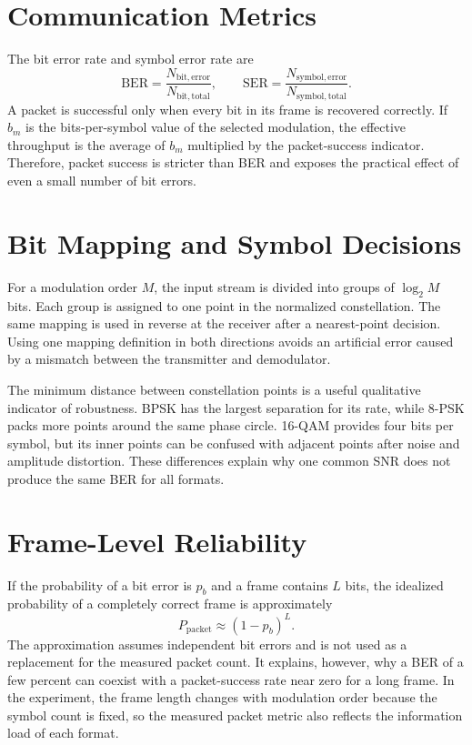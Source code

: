 \documentclass[12pt,twoside,openright]{report}
\begin{document}
\section{Communication Metrics}
The bit error rate and symbol error rate are
\begin{equation}
\mathrm{BER}=\frac{N_{\mathrm{bit,error}}}{N_{\mathrm{bit,total}}},
\qquad
\mathrm{SER}=\frac{N_{\mathrm{symbol,error}}}{N_{\mathrm{symbol,total}}}.
\end{equation}
A packet is successful only when every bit in its frame is recovered
correctly. If $b_m$ is the bits-per-symbol value of the selected modulation,
the effective throughput is the average of $b_m$ multiplied by the
packet-success indicator. Therefore, packet success is stricter than BER
and exposes the practical effect of even a small number of bit errors.

\section{Bit Mapping and Symbol Decisions}
For a modulation order $M$, the input stream is divided into groups of
$\log_2 M$ bits. Each group is assigned to one point in the normalized
constellation. The same mapping is used in reverse at the receiver after a
nearest-point decision. Using one mapping definition in both directions
avoids an artificial error caused by a mismatch between the transmitter and
demodulator.

The minimum distance between constellation points is a useful qualitative
indicator of robustness. BPSK has the largest separation for its rate, while
8-PSK packs more points around the same phase circle. 16-QAM provides four
bits per symbol, but its inner points can be confused with adjacent points
after noise and amplitude distortion. These differences explain why one
common SNR does not produce the same BER for all formats.

\section{Frame-Level Reliability}
If the probability of a bit error is $p_b$ and a frame contains $L$ bits,
the idealized probability of a completely correct frame is approximately
\begin{equation}
P_{\mathrm{packet}}\approx(1-p_b)^L.
\end{equation}
The approximation assumes independent bit errors and is not used as a
replacement for the measured packet count. It explains, however, why a BER
of a few percent can coexist with a packet-success rate near zero for a
long frame. In the experiment, the frame length changes with modulation
order because the symbol count is fixed, so the measured packet metric also
reflects the information load of each format.
\end{document}
